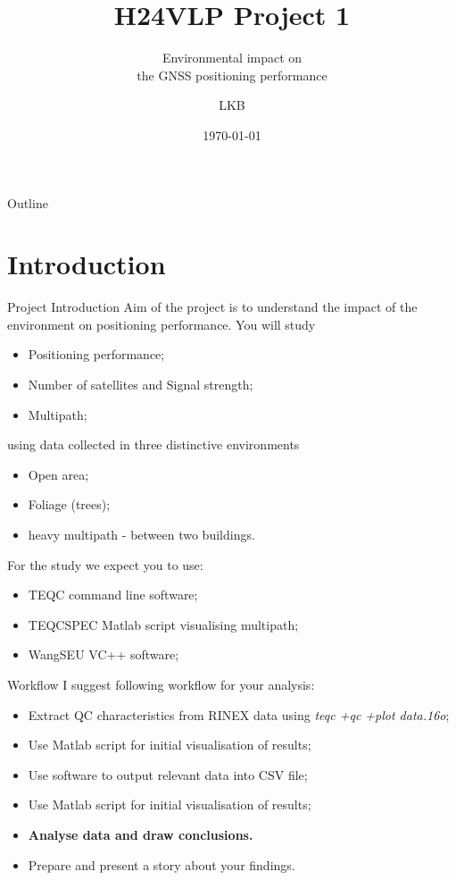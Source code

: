 \documentclass[11pt]{beamer}
\title[H24VLP]{H24VLP Project 1}
\subtitle{Environmental impact on \\the GNSS positioning performance}
\author{LKB}
\institute{NGI}
\date{\today}
\begin{document}
	
	\begin{frame}
		\titlepage
	\end{frame}
	
	\begin{frame}{Outline}
		\tableofcontents
	\end{frame}
	
\section{Introduction}

	\begin{frame}[allowframebreaks]{Project Introduction}
		Aim of the project is to understand the impact of the environment on positioning performance. You will study 
		\begin{itemize}
			\item Positioning performance;
			\item Number of satellites and Signal strength;
			\item Multipath;
		\end{itemize}
		using data collected in three distinctive environments
		\begin{itemize}
			\item Open area;
			\item Foliage (trees);
			\item heavy multipath - between two buildings.
		\end{itemize}
		For the study we expect you to use:
		\begin{itemize}
			\item TEQC command line software;
			\item TEQCSPEC Matlab script visualising multipath;
			\item WangSEU VC++ software;
		\end{itemize}

	\end{frame}

	\begin{frame}{Workflow}
		I suggest following workflow for your analysis:
		
		\begin{itemize}
			\item Extract QC characteristics from RINEX data using \textit{ teqc +qc +plot data.16o};
			\item Use Matlab script for initial visualisation of results;
			\item Use software to output relevant data into CSV file;
			\item Use Matlab script for initial visualisation of results;
			\item \textbf{Analyse data and draw conclusions.}
			\item \alert{Prepare and present a story about your findings.}
		\end{itemize}
	\end{frame}
\end{document}
